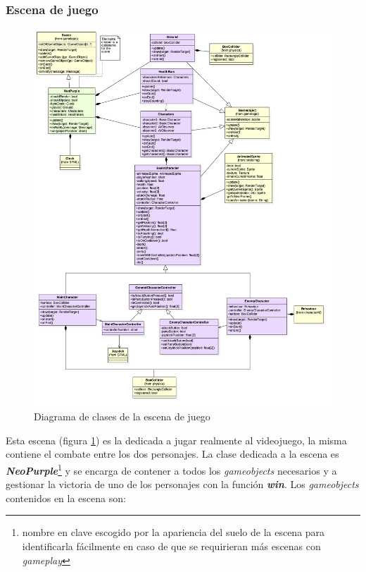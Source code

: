 \subsubsection*{Escena de juego}

\begin{figure}
	\caption{Diagrama de clases de la escena de juego}
	\hspace*{-0.1cm}  
	\centerline{\includegraphics[width=20cm]{otros/UML/png/alld/png/gamelogic__gameplay__diagramaDeClases_scene_gameplay_4.png}}
	\label{class:gameplay}
\end{figure}

Esta escena (figura \ref{class:gameplay}) es la dedicada a jugar realmente al videojuego, la misma contiene el combate entre los dos personajes. La clase dedicada a la escena es \textbf{\textit{NeoPurple}}\footnote{nombre en clave escogido por la apariencia del suelo de la escena para identificarla fácilmente en caso de que se requirieran más escenas con \textit{gameplay}} y se encarga de contener a todos los \textit{gameobjects} necesarios y a gestionar la victoria de uno de los personajes con la función \textbf{\textit{win}}. Los \textit{gameobjects} contenidos en la escena son:

